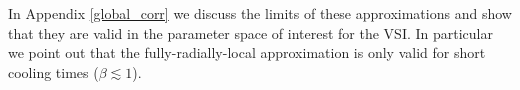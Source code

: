  In Appendix \ref{global_corr}  we discuss the limits of these approximations
 and show that they are valid in the parameter space of interest for the VSI.
In particular we point out that the fully-radially-local approximation is only valid for
short cooling times ($\beta \lesssim 1$).







